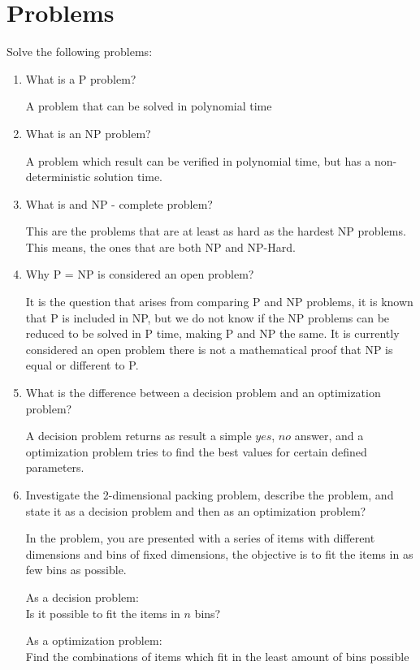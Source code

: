 \documentclass{article}
\begin{document}
\section{Problems}
Solve the following problems:
\begin{enumerate}
    \item What is a P problem?

    A problem that can be solved in polynomial time

    \item What is an NP problem?

    A problem which result can be verified in polynomial time, but has a non-deterministic solution time.

    \item What is and NP - complete problem?

    This are the problems that are at least as hard as the hardest NP problems. This means, the ones that are both NP and NP-Hard.

    \item Why P = NP is considered an open problem?

    It is the question that arises from comparing P and NP problems, it is known that P is included in NP, but we do not know if the NP problems can be reduced to be solved in P time, making P and NP the same.
    It is currently considered an open problem there is not a mathematical proof that NP is equal or different to P.

    \item What is the difference between a decision problem and an optimization problem?

    A decision problem returns as result a simple $yes$, $no$ answer, and a optimization problem tries to find the best values for certain defined parameters.

    \item Investigate the 2-dimensional packing problem, describe the problem, and state it as a decision problem and then as an optimization problem?

    In the problem, you are presented with a series of items with different dimensions and bins of fixed dimensions, the objective is to fit the items in as few bins as possible.

    As a decision problem:\\
    Is it possible to fit the items in $n$ bins?

    As a optimization problem:\\
    Find the combinations of items which fit in the least amount of bins possible


\end{enumerate}
\end{document}
